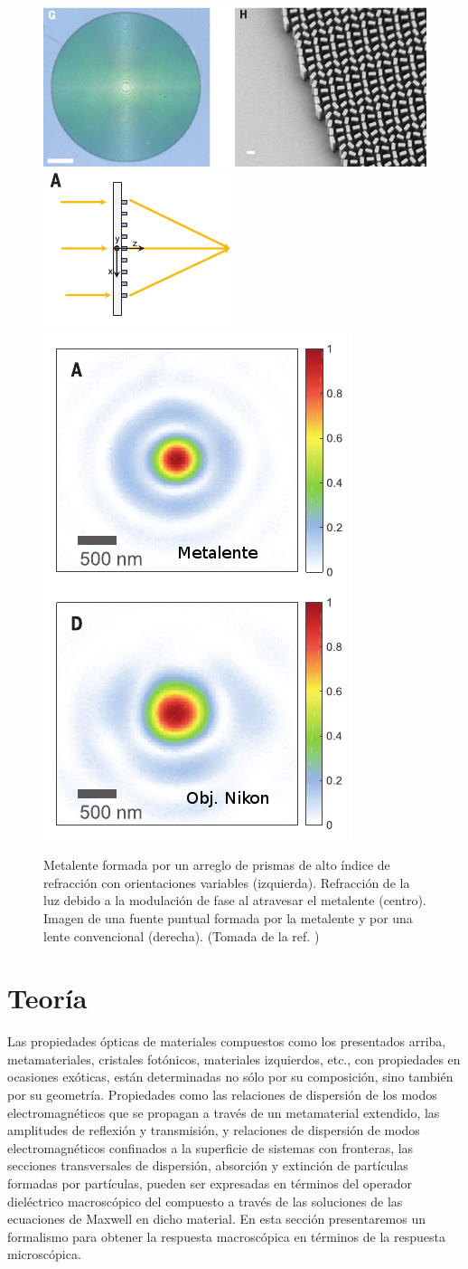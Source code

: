 \documentclass[12pt]{article}
\begin{document}
\begin{figure}
  \centering
  \includegraphics[width=.5\textwidth,angle=90, valign=c]{fig13a}
  \includegraphics[height=.3\textwidth,valign=c]{fig13b}
  \includegraphics[height=.5\textwidth,valign=c]{fig13c}
\caption{Metalente formada por un arreglo de prismas de alto índice
    de refracción con orientaciones variables (izquierda). Refracción
    de la luz debido a la modulación de fase al atravesar el metalente
    (centro). Imagen de una
    fuente puntual formada por la metalente y por una lente
    convencional (derecha). (Tomada de la ref. \cite{metalente})}
  \label{fig:metalente}
\end{figure}

\section{Teoría}

Las propiedades ópticas de materiales compuestos como los presentados
arriba, metamateriales, cristales fotónicos, materiales izquierdos,
etc., con propiedades en ocasiones exóticas, están determinadas no
sólo por su composición, sino también por su geometría. Propiedades
como las relaciones de dispersión de los modos electromagnéticos que
se propagan a través de un metamaterial extendido, las amplitudes de
reflexión y transmisión, y relaciones de dispersión de modos
electromagnéticos confinados a la superficie de sistemas con
fronteras, las secciones transversales de dispersión, absorción y
extinción de partículas formadas por partículas, pueden ser expresadas
en términos del operador dieléctrico macroscópico del compuesto a
través de las soluciones de las ecuaciones de Maxwell en dicho
material. En esta sección presentaremos un formalismo para obtener la
respuesta macroscópica en términos de la respuesta microscópica.
\end{document}
